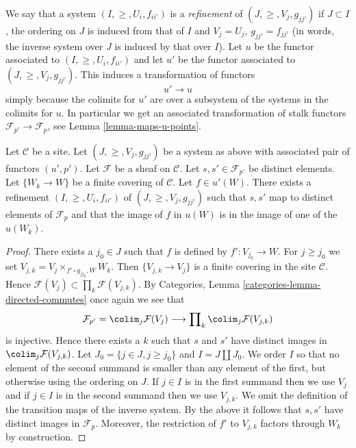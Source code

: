 \medskip\noindent
We say that a system $(I, \geq, U_i, f_{ii'})$
is a {\it refinement} of $(J, \geq, V_j, g_{jj'})$ if
$J \subset I$, the ordering on $J$ is induced from that of $I$
and $V_j = U_j$, $g_{jj'} = f_{jj'}$ (in words, the inverse system
over $J$ is induced by that over $I$). Let $u$ be the functor
associated to $(I, \geq, U_i, f_{ii'})$ and let $u'$ be the
functor associated to $(J, \geq, V_j, g_{jj'})$.
This induces a transformation of functors
$$
u' \longrightarrow u
$$
simply because the colimits for $u'$ are over a subsystem
of the systems in the colimits for $u$.
In particular we get an associated transformation of
stalk functors $\mathcal{F}_{p'} \to \mathcal{F}_p$,
see Lemma \ref{lemma-maps-u-points}.

\begin{lemma}
\label{lemma-refine}
Let $\mathcal{C}$ be a site.
Let $(J, \geq, V_j, g_{jj'})$ be a system as above with associated
pair of functors $(u', p')$.
Let $\mathcal{F}$ be a sheaf on $\mathcal{C}$.
Let $s, s' \in \mathcal{F}_{p'}$ be distinct elements.
Let $\{W_k \to W\}$ be a finite covering of $\mathcal{C}$.
Let $f \in u'(W)$.
There exists a refinement $(I, \geq, U_i, f_{ii'})$
of $(J, \geq, V_j, g_{jj'})$ such that $s, s'$ map
to distinct elements of $\mathcal{F}_p$ and that
the image of $f$ in $u(W)$ is in the image of one of
the $u(W_k)$.
\end{lemma}

\begin{proof}
There exists a $j_0 \in J$ such that $f$ is defined by $f' : V_{j_0} \to W$.
For $j \geq j_0$ we set $V_{j, k} = V_j \times_{f'\circ g_{j j_0}, W} W_k$.
Then $\{V_{j, k} \to V_j\}$ is a finite covering in the site
$\mathcal{C}$. Hence
$\mathcal{F}(V_j) \subset \prod_k \mathcal{F}(V_{j, k})$.
By Categories, Lemma \ref{categories-lemma-directed-commutes}
once again we see that
$$
\mathcal{F}_{p'} =
\colim_j \mathcal{F}(V_j)
\longrightarrow
\prod\nolimits_k \colim_j \mathcal{F}(V_{j, k})
$$
is injective. Hence there exists a $k$ such that $s$ and $s'$
have distinct images in $\colim_j \mathcal{F}(V_{j, k})$.
Let $J_0 = \{j \in J, j \geq j_0\}$ and $I = J \amalg J_0$.
We order $I$ so that no element of the second summand
is smaller than any element of the first, but otherwise
using the ordering on $J$. If $j \in I$ is in the first
summand then we use $V_j$ and if $j \in I$ is in the second
summand then we use $V_{j, k}$. We omit the definition
of the transition maps of the inverse system. By the above
it follows that $s, s'$ have distinct images in $\mathcal{F}_p$.
Moreover, the restriction of $f'$ to $V_{j, k}$ factors
through $W_k$ by construction.
\end{proof}

